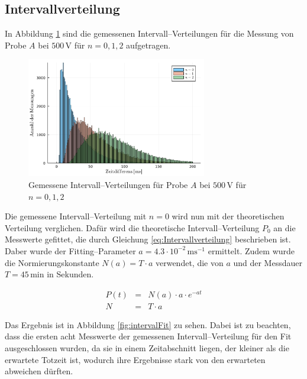 \documentclass[12pt,a4paper]{scrartcl}
\numberwithin{equation}{section} %
\renewcommand{\[}{} %
\renewcommand{\]}{\noindent} %
\begin{document}
\hypertarget{intervallverteilung}{%
\subsection{Intervallverteilung}\label{intervallverteilung}}
In Abbildung \ref{fig:interval} sind die gemessenen Intervall--Verteilungen für die Messung von Probe $A$ bei $500 \mathrm{\, V}$ für $n = 0,1,2$ aufgetragen.

\begin{figure}[h]
	\centering
	\includegraphics[width=0.7\textwidth]{../media/B3.1/interval.pdf}
	\caption{Gemessene Intervall--Verteilungen für Probe $A$ bei $500 \mathrm{\, V}$ für $n = 0,1,2$}
	\label{fig:interval}
\end{figure}

Die gemessene Intervall--Verteilung mit $n = 0$ wird nun mit der theoretischen Verteilung verglichen. Dafür wird die theoretische Intervall--Verteilung $P_0$ an die Messwerte gefittet, die durch Gleichung \eqref{eq:Intervallverteilung} beschrieben ist. Daber wurde der Fitting--Parameter $a = 4.3 \cdot 10^{-2} \mathrm{\,ms^{-1}}$ ermittelt. Zudem wurde die Normierungskonstante $N(a)=T\cdot a$ verwendet, die von $a$ und der Messdauer $T=45\mathrm{\,min}$ in Sekunden.

\begin{eqnarray}
	P(t) &=& N(a) \cdot a \cdot e^{-at} \\
	N &=& T \cdot a
\end{eqnarray}

\noindent
Das Ergebnis ist in Abbildung \ref{fig:intervalFit} zu sehen. Dabei ist zu beachten, dass die ersten acht Messwerte der gemessenen Intervall--Verteilung für den Fit ausgeschlossen wurden, da sie in einem Zeitabschnitt liegen, der kleiner als die erwartete Totzeit ist, wodurch ihre Ergebnisse stark von den erwarteten abweichen dürften.
\end{document}
